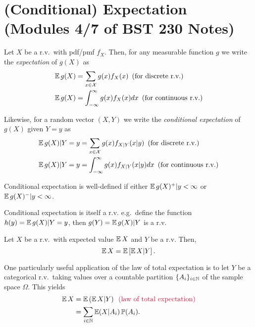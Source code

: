\section{(Conditional) Expectation (Modules 4/7 of BST 230 Notes)}

Let $X$ be a r.v.\ with pdf/pmf $f_X$. 
Then, for any measurable function $g$ we write the \emph{expectation} of $g(X)$ as
\begin{align*}
    \operatorname*{\mathbb{E}} g(X)
        &= \sum_{x \in \mathcal{X}} g(x) f_X(x) \hspace{5pt} (\text{for discrete r.v.}) \\
    \operatorname*{\mathbb{E}} g(X)
        &= \int_{-\infty}^{\infty} g(x) f_X(x) dx \hspace{5pt} (\text{for continuous r.v.})
\end{align*}

Likewise, for a random vector $(X,Y)$ we write the \emph{conditional expectation} of 
$g(X)$ given $Y=y$ as
\begin{align*}
    \operatorname*{\mathbb{E}} g(X) | Y=y
        &= \sum_{x \in \mathcal{X}} g(x) f_{X|Y}(x|y) \hspace{5pt} (\text{for discrete r.v.}) \\
    \operatorname*{\mathbb{E}} g(X) | Y=y
        &= \int_{-\infty}^{\infty} g(x) f_{X|Y}(x|y) dx \hspace{5pt} (\text{for continuous r.v.})
\end{align*} 

Conditional expectation is well-defined if either $\operatorname*{\mathbb{E}} g(X)^+ | y < \infty$ or 
$\operatorname*{\mathbb{E}} g(X)^- | y < \infty$.

Conditional expectation is itself a r.v.\; e.g.\ define the function 
$h(y) = \operatorname*{\mathbb{E}} g(X) | Y=y$, then $g(Y) = \operatorname*{\mathbb{E}} g(X) | Y$ is a r.v.

\begin{theorem}
    Let $X$ be a r.v.\ with expected value $\operatorname*{\mathbb{E}} X$ and $Y$ be a r.v.
    Then,
    \[
        \operatorname*{\mathbb{E}} X = \operatorname*{\mathbb{E}} \left[ \operatorname*{\mathbb{E}} X | Y \right].
    \]
\end{theorem}

One particularly useful application of the law of total expectation is 
to let $Y$ be a categorical r.v.\ taking values over a countable partition $\{A_i\}_{i \in \mathbb N}$
of the sample space $\Omega$. This yields
\begin{align*}
    \E X
        &= \E \left( \E X | Y \right) \comm{law of total expectation} \\
        &= \sum_{i \in \N} \E (X | A_i) \Pr(A_i).
\end{align*}

